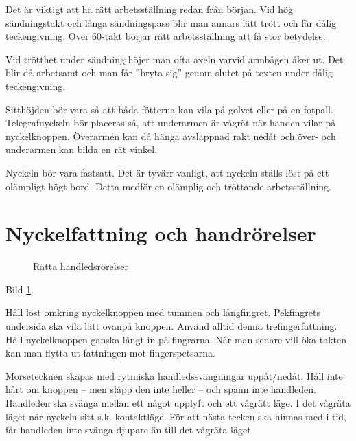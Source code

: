 Det är viktigt att ha rätt arbetsställning redan från början. Vid hög
sändningstakt och långa sändningspass blir man annars lätt trött och får dålig
teckengivning. Över 60-takt börjar rätt arbetsställning att få stor betydelse.

Vid trötthet under sändning höjer man ofta axeln varvid armbågen åker ut. Det
blir då arbetsamt och man får ''bryta sig'' genom slutet på texten under dålig
teckengivning.

Sitthöjden bör vara så att båda fötterna kan vila på golvet eller på en fotpall.
Telegrafnyckeln bör placeras så, att underarmen är vågrät när handen vilar på
nyckelknoppen. Överarmen kan då hänga avslappnad rakt nedåt och över- och
underarmen kan bilda en rät vinkel.

Nyckeln bör vara fastsatt. Det är tyvärr vanligt, att nyckeln ställs löst på ett
olämpligt högt bord. Detta medför en olämplig och tröttande arbetsställning.

\section{Nyckelfattning och handrörelser}

\begin{figure}
  \caption{Rätta handledsrörelser}
  \label{fig:bild_morse_5}
\end{figure}

Bild \ref{fig:bild_morse_5}.

Håll löst omkring nyckelknoppen med tummen och långfingret. Pekfingrets
undersida ska vila lätt ovanpå knoppen. Använd alltid denna
trefingerfattning. Håll nyckelknoppen ganska långt in på fingrarna. När man
senare vill öka takten kan man flytta ut fattningen mot fingerspetsarna.

Morsetecknen skapas med rytmiska handledssvängningar uppåt/nedåt. Håll inte hårt
om knoppen -- men släpp den inte heller -- och spänn inte handleden. Handleden
ska svänga mellan ett något upplyft och ett vågrätt läge. I det vågräta läget
når nyckeln sitt s.k. kontaktläge. För att nästa tecken ska hinnas med i tid,
får handleden inte svänga djupare än till det vågräta läget.

